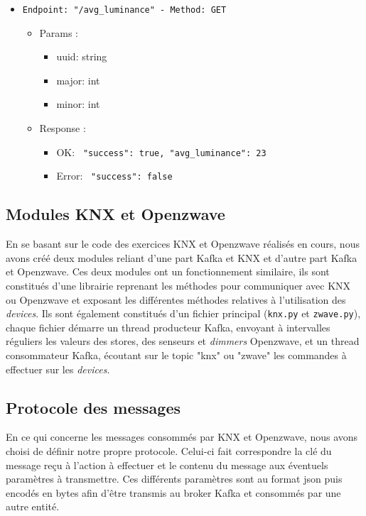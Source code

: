 \begin{itemize}
  \item \texttt{Endpoint: "/avg_luminance" -  Method: GET}
  \begin{itemize} 
    \item Params :
    \begin{itemize}
      \item uuid: string
      \item major: int
      \item minor: int
    \end{itemize}

    \item Response : 
    \begin{itemize}
      \item OK: \texttt{{ "success": true, "avg_luminance": 23 }}
      \item Error: \texttt{{ "success": false }}
    \end{itemize}
  \end{itemize}
\end{itemize}




\subsection{Modules KNX et Openzwave}
En se basant sur le code des exercices KNX et Openzwave réalisés en cours, nous avons créé deux modules reliant d'une part Kafka et KNX et d'autre part Kafka et Openzwave. Ces deux modules ont un fonctionnement similaire, ils sont constitués d'une librairie reprenant les méthodes pour communiquer avec KNX ou Openzwave et exposant les différentes méthodes relatives à l'utilisation des \textit{\textit{devices}}. Ils sont également constitués d'un fichier principal (\texttt{knx.py} et \texttt{zwave.py}), chaque fichier démarre un thread producteur Kafka, envoyant à intervalles réguliers les valeurs des stores, des senseurs et \textit{dimmers} Openzwave, et un thread consommateur Kafka, écoutant sur le topic "knx" ou "zwave" les commandes à effectuer sur les \textit{\textit{devices}}.

\subsection{Protocole des messages}
En ce qui concerne les messages consommés par KNX et Openzwave, nous avons choisi de définir notre propre protocole.
Celui-ci fait correspondre la clé du message reçu à l'action à effectuer et le contenu du message aux éventuels paramètres à transmettre. Ces différents paramètres sont au format \acrshort{json} puis encodés en bytes afin d'être transmis au broker Kafka et consommés par une autre entité.

